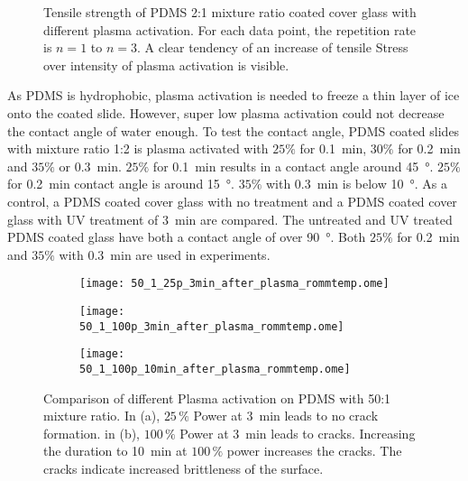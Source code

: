 \begin{figure}[hbt!]
	\centering
	
	\caption{Tensile strength of PDMS 2:1 mixture ratio coated cover glass with different plasma activation. For each data point, the repetition rate is $n = 1$ to $ n =3$. A clear tendency of an increase of tensile Stress over intensity of plasma activation is visible.}
	\label{fig:PlotPlasmaAktivierung}
\end{figure}

As PDMS is hydrophobic, plasma activation is needed to freeze a thin layer of ice onto the coated slide. However, super low plasma activation could not decrease the contact angle of water enough. To test the contact angle,  PDMS coated slides with mixture ratio 1:2 is plasma activated with $25\%$ for \SI{0.1}{\minute}, $30\%$ for \SI{0.2}{\minute} and $35\%$ or \SI{0.3}{\minute}. $25\%$ for \SI{0.1}{\minute} results in a contact angle around \SI{45}{\degree}. $25\%$ for \SI{0.2}{\minute} contact angle is around \SI{15}{\degree}. $35\%$ with \SI{0.3}{\minute} is below \SI{10}{\degree}. As a control, a PDMS coated cover glass with no treatment and a PDMS coated cover glass with UV treatment of \SI{3}{\minute} are compared. The untreated and UV treated PDMS coated glass have both a contact angle of over \SI{90}{\degree}. Both $25\%$ for \SI{0.2}{\minute} and $35\%$ with \SI{0.3}{\minute} are used in experiments.


\begin{figure}[hbt!]
	\centering
	\begin{subfigure}[]{0.45\textwidth}
		\centering
		\texttt{[image: 50\_1\_25p\_3min\_after\_plasma\_rommtemp.ome]}
		\caption{}
	\end{subfigure}
	\begin{subfigure}[]{0.45\textwidth}
		\centering
		\texttt{[image: 50\_1\_100p\_3min\_after\_plasma\_rommtemp.ome]}
		\caption{}
	\end{subfigure}
	\begin{subfigure}[]{0.45\textwidth}
		\centering
		\texttt{[image: 50\_1\_100p\_10min\_after\_plasma\_rommtemp.ome]}
		\caption{}
	\end{subfigure}
	\caption{Comparison of different Plasma activation on PDMS with 50:1 mixture ratio. In (a), $25\,\%$ Power at \SI{3}{\minute} leads to no crack formation. in (b), $100\,\%$ Power at \SI{3}{\minute} leads to cracks. Increasing the duration to \SI{10}{\minute} at $100\,\%$ power increases the cracks. The cracks indicate increased brittleness of the surface.}
	\label{fig:Vgl50:1Plasma}
\end{figure}

